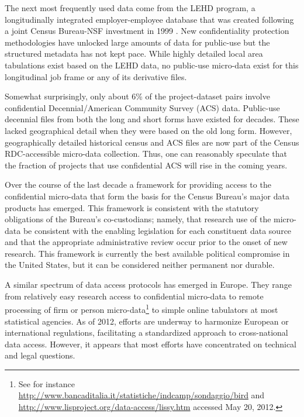 The next most frequently used data come from the \acf{LEHD} program, a
longitudinally integrated employer-employee database that was created
following a joint Census Bureau-NSF investment in 1999 \cite{AbowdEtAl2009}.
New confidentiality protection methodologies \cite{AbowdEtAl2012,Ashwin2008}
have unlocked large amounts of data for public-use but the structured
metadata has not kept pace. While highly detailed local area tabulations
exist based on the \ac{LEHD} data, no public-use micro-data exist for this
longitudinal job frame or any of its derivative files.

Somewhat surprisingly, only about 6\% of the project-dataset pairs involve
confidential Decennial/American Community Survey (ACS) data. Public-use
decennial files from both the long and short forms have existed for decades.
These lacked geographical detail when they were based on the old long form.
However, geographically detailed historical census and ACS files are now
part of the Census RDC-accessible micro-data collection. Thus, one can
reasonably speculate that the fraction of projects that use confidential %
\ac{ACS} will rise in the coming years.

Over the course of the last decade a framework for providing access to the
confidential micro-data that form the basis for the Census Bureau's major
data products has emerged. This framework is consistent with the statutory
obligations of the Bureau's co-custodians; namely, that research use of the
micro-data be consistent with the enabling legislation for each constituent
data source and that the appropriate administrative review occur prior to
the onset of new research. This framework is currently the best available
political compromise in the United States, but it can be considered neither
permanent nor durable.

A similar spectrum of data access protocols has emerged in Europe. They
range from relatively easy research access to confidential micro-data to
remote processing of firm or person micro-data\footnote{%
See for instance \href{http://www.bancaditalia.it/statistiche/indcamp/sondaggio/bird}%
{http://www.bancaditalia.it/statistiche/indcamp/sondaggio/bird} and \href{http://www.lisproject.org/data-access/lissy.htm}%
{http://www.lisproject.org/data-access/lissy.htm} accessed May 20, 2012.} to
simple online tabulators at most statistical agencies. As of 2012, efforts
are underway to harmonize European \cite{Bujnowska2012} or international 
\cite{Lunati2012} regulations, facilitating a standardized approach to
cross-national data access. However, it appears that most efforts have
concentrated on technical and legal questions.


